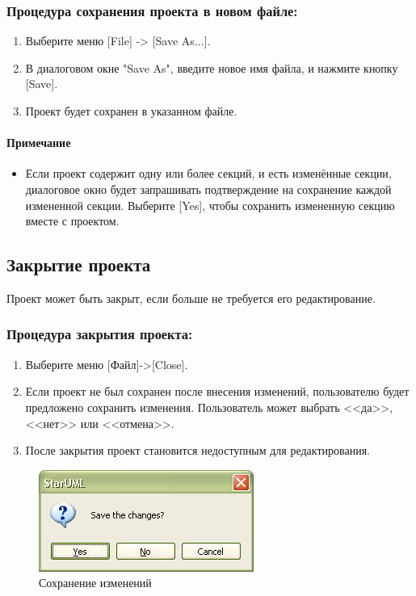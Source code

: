 \documentclass[a4paper,12pt]{report}
\begin{document}
\subsubsection*{Процедура сохранения проекта в новом файле:}
\begin{enumerate}
	\item Выберите меню [File] -> [Save As...].
	\item В диалоговом окне "Save As", введите новое имя файла, и нажмите кнопку [Save].
	\item Проект будет сохранен в указанном файле.
\end{enumerate}

\paragraph{Примечание}
\begin{itemize}
	\item Если проект содержит одну или более секций, и есть изменённые секции, диалоговое окно
	будет запрашивать подтверждение на сохранение каждой измененной секции. Выберите
	[Yes], чтобы сохранить измененную секцию вместе с проектом.
\end{itemize}

\subsection*{Закрытие проекта}
Проект может быть закрыт, если больше не требуется его редактирование.
\subsubsection*{Процедура закрытия проекта:}
\begin{enumerate}
	\item Выберите меню [Файл]->[Close].
	\item Если проект не был сохранен после внесения изменений, пользователю будет предложено
	сохранить изменения. Пользователь может выбрать <<да>>, <<нет>> или <<отмена>>.
	\item После закрытия проект становится недоступным для редактирования.
\end{enumerate}
\begin{figure}[h!]
	\centering
	\includegraphics[width=0.7\linewidth]{images/closeproject1}
	\caption{Сохранение изменений}
	\label{fig:closeproject1}
\end{figure}
\end{document}

